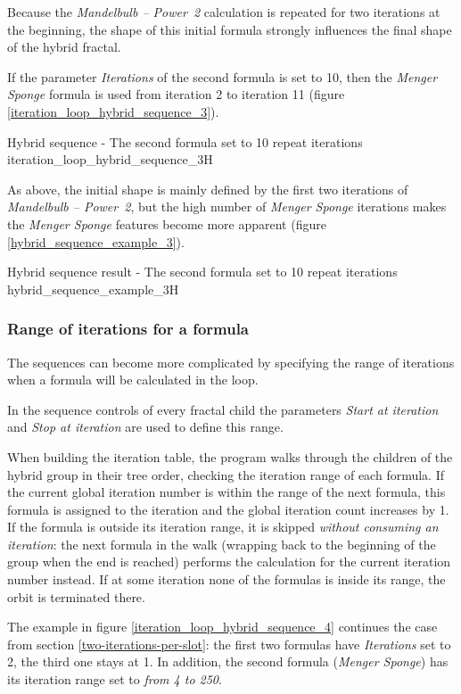 Because the \emph{Mandelbulb -- Power~2} calculation is repeated for two iterations at the beginning, the shape of this initial formula strongly influences the final shape of the hybrid fractal.

If the parameter \emph{Iterations} of the second formula is set to 10,
then the \emph{Menger Sponge} formula is used from iteration 2 to iteration 11 (figure \ref{iteration_loop_hybrid_sequence_3}).

{Hybrid sequence - The second formula set to 10 repeat iterations}
{iteration_loop_hybrid_sequence_3}{H}

As above, the initial shape is mainly defined by the first two iterations of \emph{Mandelbulb -- Power~2},
but the high number of \emph{Menger Sponge} iterations makes the \emph{Menger Sponge} features become more apparent (figure \ref{hybrid_sequence_example_3}).

{Hybrid sequence result - The second formula set to 10 repeat iterations}
{hybrid_sequence_example_3}{H}

\subsubsection{Range of iterations for a formula}

The sequences can become more complicated by specifying the range of iterations when a formula will be calculated in the loop.

In the sequence controls of every fractal child the parameters \emph{Start at iteration} and \emph{Stop at iteration} are used to define this range.

When building the iteration table, the program walks through the children of the hybrid group in their tree order, checking the iteration range of each formula. If the current global iteration number is within the range of the next formula, this formula is assigned to the iteration and the global iteration count increases by 1. If the formula is outside its iteration range, it is skipped \emph{without consuming an iteration}: the next formula in the walk (wrapping back to the beginning of the group when the end is reached) performs the calculation for the current iteration number instead. If at some iteration none of the formulas is inside its range, the orbit is terminated there.

The example in figure \ref{iteration_loop_hybrid_sequence_4} continues the case from section \ref{two-iterations-per-slot}: the first two formulas have \emph{Iterations} set to 2, the third one stays at 1. In addition, the second formula (\emph{Menger Sponge}) has its iteration range set to \emph{from 4 to 250}.


